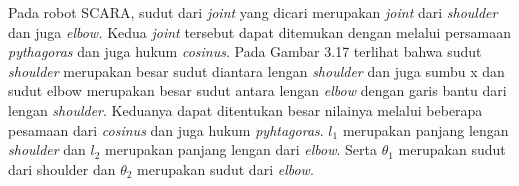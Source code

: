  
Pada robot SCARA, sudut dari \textit{joint} yang dicari merupakan \textit{joint} dari \textit{shoulder} dan juga \textit{elbow.} Kedua \textit{joint} tersebut dapat ditemukan dengan melalui persamaan \textit{pythagoras} dan juga hukum \textit{cosinus}. Pada Gambar 3.17 terlihat bahwa sudut \textit{shoulder} merupakan besar sudut diantara lengan \textit{shoulder} dan juga sumbu x dan sudut elbow merupakan besar sudut antara lengan \textit{elbow} dengan garis bantu dari lengan \textit{shoulder}. Keduanya dapat ditentukan besar nilainya melalui beberapa pesamaan dari \textit{cosinus} dan juga hukum \textit{pyhtagoras}. $l_{1}$ merupakan panjang lengan \textit{shoulder} dan $l_{2}$ merupakan panjang lengan dari \textit{elbow}. Serta $\theta_{1}$ merupakan sudut dari shoulder dan $\theta_{2}$ merupakan sudut dari \textit{elbow}.  

